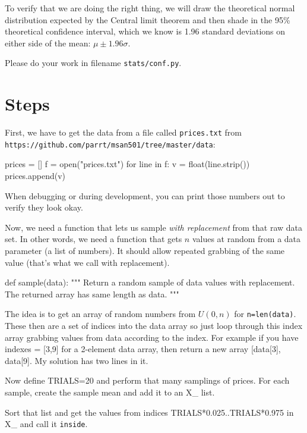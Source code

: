 \begin{fullwidth}
To verify that we are doing the right thing, we will draw the theoretical normal distribution expected by the Central limit theorem and then shade in the 95\% theoretical confidence interval, which we know is 1.96 standard deviations on either side of the mean: $\mu \pm 1.96\sigma$.

Please do your work in filename {\tt stats/conf.py}.

\section{Steps}

\step First, we have to get the data from a file called {\tt prices.txt} from \\
{\tt\small https://github.com/parrt/msan501/tree/master/data}:

\begin{pyverbatim}
prices = []
f = open("prices.txt")
for line in f:
	v = float(line.strip())
	prices.append(v)
\end{pyverbatim}

When debugging or during development, you can print those numbers out to verify they look okay.

\step Now, we need a function that lets us sample {\em with replacement} from that raw data set. In other words, we need a function that gets $n$ values at random from a data parameter (a list of numbers). It should allow repeated grabbing of the same value (that's what we call with replacement).

\begin{pyverbatim}
def sample(data):
	"""
	Return a random sample of data values with replacement.
	The returned array has same length as data.
	"""
\end{pyverbatim}

The idea is to get an array of random numbers from $U(0,n)$ for {\tt n=len(data)}. These then are a set of indices into the data array so just loop through this index array grabbing values from data according to the index. For example if you have indexes = [3,9] for a 2-element data array, then return a new array [data[3], data[9]. My solution has two lines in it.

\step Now define TRIALS=20 and perform that many samplings of prices. For each sample, create the sample mean and add it to an X\_ list.

\step Sort that list and get the values from indices TRIALS*0.025..TRIALS*0.975 in X\_ and call it {\tt inside}.


\end{fullwidth}
